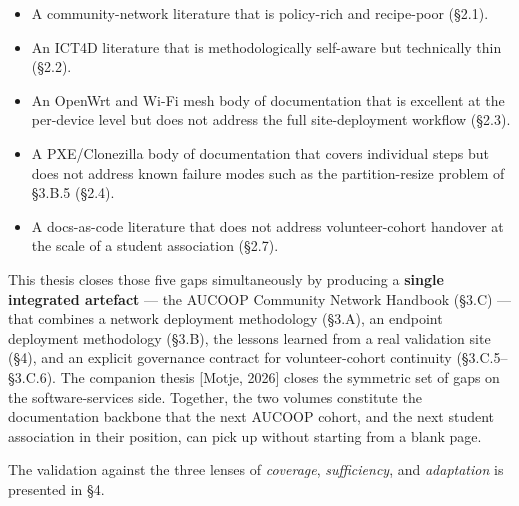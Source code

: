 \begin{itemize}
\tightlist
\item
  A community-network literature that is policy-rich and recipe-poor
  (§2.1).
\item
  An ICT4D literature that is methodologically self-aware but
  technically thin (§2.2).
\item
  An OpenWrt and Wi-Fi mesh body of documentation that is excellent at
  the per-device level but does not address the full site-deployment
  workflow (§2.3).
\item
  A PXE/Clonezilla body of documentation that covers individual steps
  but does not address known failure modes such as the partition-resize
  problem of §3.B.5 (§2.4).
\item
  A docs-as-code literature that does not address volunteer-cohort
  handover at the scale of a student association (§2.7).
\end{itemize}

This thesis closes those five gaps simultaneously by producing a
\textbf{single integrated artefact} --- the AUCOOP Community Network
Handbook (§3.C) --- that combines a network deployment methodology
(§3.A), an endpoint deployment methodology (§3.B), the lessons learned
from a real validation site (§4), and an explicit governance contract
for volunteer-cohort continuity (§3.C.5--§3.C.6). The companion thesis
{[}Motje, 2026{]} closes the symmetric set of gaps on the
software-services side. Together, the two volumes constitute the
documentation backbone that the next AUCOOP cohort, and the next student
association in their position, can pick up without starting from a blank
page.

The validation against the three lenses of \emph{coverage},
\emph{sufficiency}, and \emph{adaptation} is presented in §4.
